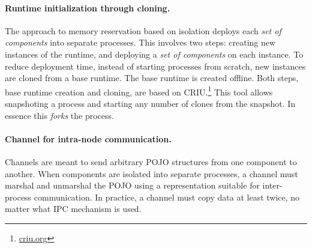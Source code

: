 %

\paragraph{Runtime initialization through cloning.}
The approach to memory reservation based on isolation deploys each \textit{set of components} into separate processes.
This involves two steps: creating new instances of the runtime, and deploying a \textit{set of components} on each instance.
To reduce deployment time, instead of starting processes from scratch,
new instances are cloned from a base runtime.
The base runtime is created offline. %
Both steps, base runtime creation and cloning, are based on CRIU.\footnote{\url{criu.org}}
This tool allows snapshoting a process and starting any number of clones from the snapshot.
In essence this \textit{forks} the process.


\paragraph{Channel for intra-node communication.}
Channels are meant to send arbitrary POJO structures from one component to another.
When components are isolated into separate processes,
a channel must marshal and unmarshal the POJO using a representation suitable for inter-process communication.
In practice, a channel must copy data at least twice, no matter what IPC mechanism is used.

